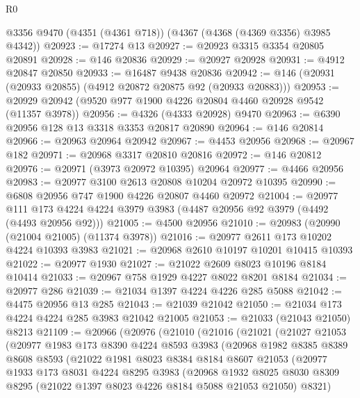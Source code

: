 \begin{lexlean}{R0}
\begin{coremodule}
    @3356
    @9470
    (@4351 (@4361 @718))
    (@4367 (@4368 (@4369 @3356) @3985 @4342))
@20923 := @17274 @13
@20927 := @20923 @3315 @3354 @20805 @20891
@20928 := @146 @20836
@20929 := @20927 @20928
@20931 := @4912 @20847 @20850
@20933 := @16487 @9438 @20836
@20942 := @146 (@20931 (@20933 @20855) (@4912 @20872 @20875 @92 (@20933 @20883)))
@20953 := @20929 @20942 (@9520 @977 @1900 @4226 @20804 @4460 @20928 @9542 (@11357 @3978))
@20956 := @4326 (@4333 @20928) @9470
@20963 := @6390 @20956 @128 @13 @3318 @3353 @20817 @20890
@20964 := @146 @20814
@20966 := @20963 @20964 @20942
@20967 := @4453 @20956
@20968 := @20967 @182
@20971 := @20968 @3317 @20810 @20816
@20972 := @146 @20812
@20976 := @20971 (@3973 @20972 @10395) @20964
@20977 := @4466 @20956
@20983 := @20977 @3100 @2613 @20808 @10204 @20972 @10395
@20990 := @6808 @20956 @747 @1900 @4226 @20807 @4460 @20972
@21004 := @20977
    @111
    @173
    @4224
    @4224
    @3979
    @3983
    (@4487 @20956 @92 @3979 (@4492 (@4493 @20956 @92)))
@21005 := @4500 @20956
@21010 := @20983 (@20990 (@21004 @21005) (@11374 @3978))
@21016 := @20977 @2611 @173 @10202 @4224 @10393 @3983
@21021 := @20968 @2610 @10197 @10201 @10415 @10393
@21022 := @20977 @1930
@21027 := @21022 @2609 @8023 @10196 @8184 @10414
@21033 := @20967 @758 @1929 @4227 @8022 @8201 @8184
@21034 := @20977 @286
@21039 := @21034 @1397 @4224 @4226 @285 @5088
@21042 := @4475 @20956 @13 @285
@21043 := @21039 @21042
@21050 := @21034 @173 @4224 @4224 @285 @3983 @21042 @21005
@21053 := @21033 (@21043 @21050) @8213
@21109 := @20966
    (@20976
      (@21010
        (@21016
          (@21021
            (@21027
              @21053
              (@20977
                @1983
                @173
                @8390
                @4224
                @8593
                @3983
                (@20968
                  @1982
                  @8385
                  @8389
                  @8608
                  @8593
                  (@21022
                    @1981
                    @8023
                    @8384
                    @8184
                    @8607
                    @21053
                    (@20977
                      @1933
                      @173
                      @8031
                      @4224
                      @8295
                      @3983
                      (@20968
                        @1932
                        @8025
                        @8030
                        @8309
                        @8295
                        (@21022 @1397 @8023 @4226 @8184 @5088 @21053 @21050)
                        @8321)

\end{coremodule}
\end{lexlean}
